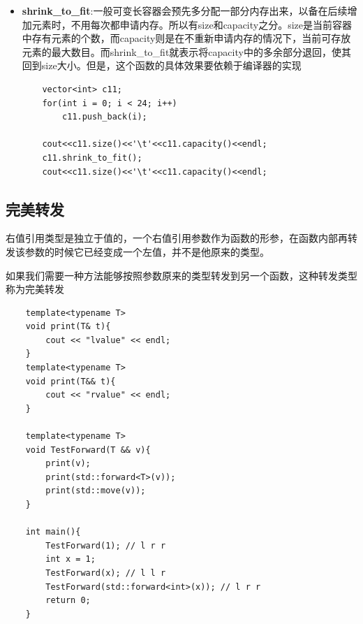\documentclass[UTF8,a4paper,12pt]{ctexbook} %
\begin{document}
\begin{itemize}
						可以通过如下方式，获取\verb|tuple|中的元素、\verb|tuple|的长度等：
						\begin{lstlisting}
	//tuple<int, string, vector<int>> c14 = {1, "tuple", {0, 1, 2, 3, 4}}; // wrong. must explicit initialize
							
	tuple<int, string, vector<int>> c14{1, "tuple", {0, 1, 2, 3, 4}};
							
	get<0>(c14) = 2;	// 赋值-修改值
	typedef decltype(c14) ctype;
	size_t sz = tuple_size<ctype>::value;
	cout<<get<0>(c14)<<'\t'<<get<1>(c14)<<'\t'<<get<2>(c14)[0]<<'\t'<<sz<<endl;
						\end{lstlisting}
						
						\item \textbf{shrink\_to\_fit}:一般可变长容器会预先多分配一部分内存出来，以备在后续增加元素时，不用每次都申请内存。所以有size和capacity之分。size是当前容器中存有元素的个数，而capacity则是在不重新申请内存的情况下，当前可存放元素的最大数目。而shrink\_to\_fit就表示将capacity中的多余部分退回，使其回到size大小。但是，这个函数的具体效果要依赖于编译器的实现
						\begin{lstlisting}
	vector<int> c11;
	for(int i = 0; i < 24; i++)
		c11.push_back(i);
								
	cout<<c11.size()<<'\t'<<c11.capacity()<<endl;
	c11.shrink_to_fit();
	cout<<c11.size()<<'\t'<<c11.capacity()<<endl;
						\end{lstlisting}
					\end{itemize}
		\subsection{完美转发}	
			右值引用类型是独立于值的，一个右值引用参数作为函数的形参，在函数内部再转发该参数的时候它已经变成一个左值，并不是他原来的类型。
			
			如果我们需要一种方法能够按照参数原来的类型转发到另一个函数，这种转发类型称为完美转发
			
			\begin{lstlisting}
	template<typename T>
	void print(T& t){
	    cout << "lvalue" << endl;
	}
	template<typename T>
	void print(T&& t){
	    cout << "rvalue" << endl;
	}
	 
	template<typename T>
	void TestForward(T && v){
	    print(v);
	    print(std::forward<T>(v));
	    print(std::move(v));
	}
	 
	int main(){
	    TestForward(1); // l r r
	    int x = 1;
	    TestForward(x); // l l r
	    TestForward(std::forward<int>(x)); // l r r
	    return 0;
	}
			\end{lstlisting}
\end{document}
